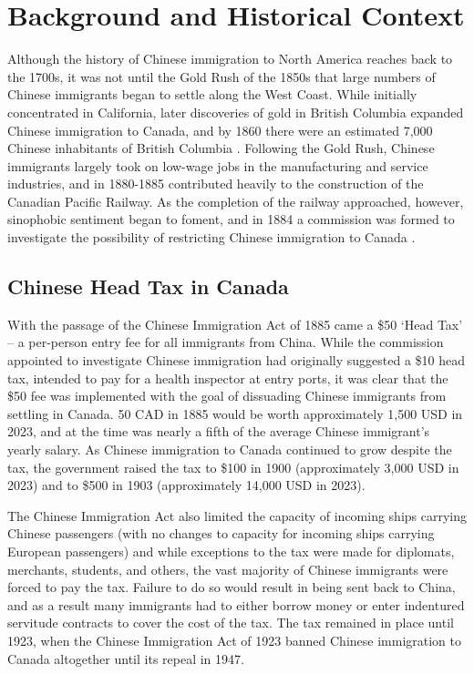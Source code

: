 \section{Background and Historical Context}
Although the history of Chinese immigration to North America reaches back to the 1700s, it was not until the Gold Rush of the 1850s that large numbers of Chinese immigrants began to settle along the West Coast. 
While initially concentrated in California, later discoveries of gold in British Columbia expanded Chinese immigration to Canada, and by 1860 there were an estimated 7,000 Chinese inhabitants of British Columbia \citep{chan2019}.
Following the Gold Rush, Chinese immigrants largely took on low-wage jobs in the manufacturing and service industries, and in 1880-1885 contributed heavily to the construction of the Canadian Pacific Railway.
As the completion of the railway approached, however, sinophobic sentiment began to foment, and in 1884 a commission was formed to investigate the possibility of restricting Chinese immigration to Canada \citep{chan2016}.

\subsection{Chinese Head Tax in Canada}
With the passage of the Chinese Immigration Act of 1885 came a \$50 `Head Tax' -- a per-person entry fee for all immigrants from China. While the commission appointed to investigate Chinese immigration had originally suggested a \$10 head tax, intended to pay for a health inspector at entry ports,
it was clear that the \$50 fee was implemented with the goal of dissuading Chinese immigrants from settling in Canada. 50 CAD in 1885 would be worth approximately 1,500 USD in 2023, and at the time was nearly a fifth of the average Chinese immigrant's yearly salary.
As Chinese immigration to Canada continued to grow despite the tax, the government raised the tax to \$100 in 1900 (approximately 3,000 USD in 2023) and to \$500 in 1903 (approximately 14,000 USD in 2023). 

The Chinese Immigration Act also limited the capacity of incoming ships carrying Chinese passengers (with no changes to capacity for incoming ships carrying European passengers) and while exceptions to the tax were made for diplomats, merchants, students, and others, the vast majority of Chinese immigrants were forced to pay the tax. 
Failure to do so would result in being sent back to China, and as a result many immigrants had to either borrow money or enter indentured servitude contracts to cover the cost of the tax. 
The tax remained in place until 1923, when the Chinese Immigration Act of 1923 banned Chinese immigration to Canada altogether until its repeal in 1947.

